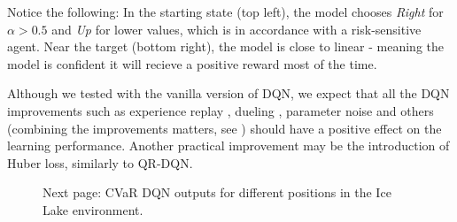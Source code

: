 Notice the following: In the starting state (top left), the model chooses \textit{Right} for $\alpha > 0.5$ and \textit{Up} for lower values, which is in accordance with a risk-sensitive agent. Near the target (bottom right), the model is close to linear - meaning the model is confident it will recieve a positive reward most of the time. 

Although we tested with the vanilla version of DQN, we expect that all the DQN improvements such as experience replay \citep{hessel2017rainbow}, dueling \citep{wang2015dueling}, parameter noise \citep{plappert2017parameter} and others (combining the improvements matters, see \citep{hessel2017rainbow}) should have a positive effect on the learning performance. Another practical improvement may be the introduction of Huber loss, similarly to QR-DQN.


\begin{figure}[h]
\caption[CVaR DQN outputs for different positions in the Ice Lake environment.]{Next page: CVaR DQN outputs for different positions in the Ice Lake environment.}
\label{fig:icefull}
\end{figure}



